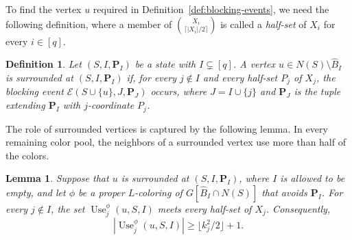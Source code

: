 \documentclass[12pt]{article}
\numberwithin{equation}{section}
\newtheorem{lemma}[theorem]{Lemma}
\newtheorem{definition}[theorem]{Definition}
\theoremstyle{definition}
\newcommand{\Use}{\operatorname{Use}}
\begin{document}
To find the vertex $u$ required in
Definition~\ref{def:blocking-events}, we need the following definition,
where a member of
$\binom{X_i}{\lceil |X_i|/2\rceil}$ is called a \emph{half-set} of $X_i$
for every $i\in[q]$.

\begin{definition}\label{def:surrounded}
Let $(S,I,\mathbf{P}_I)$ be a state with $I \subsetneq [q]$. A vertex
$u \in N(S) \setminus \hat{B}_{I}$ is \emph{surrounded at}
$(S,I,\mathbf{P}_I)$ if, for every $j \notin I$ and every half-set $P_j$ of
$X_j$, the blocking event
$\mathcal{E}(S \cup \{u\},J,\mathbf{P}_J)$ occurs, where
$J = I \cup \{j\}$ and $\mathbf{P}_J$ is the tuple extending $\mathbf{P}_I$ with
$j$-coordinate $P_j$.
\end{definition}

The role of surrounded vertices is captured by the following lemma. In every
remaining color pool, the neighbors of a surrounded vertex use more than half
of the colors.

\begin{lemma}\label{lem:recursive-hit}
Suppose that $u$ is surrounded at
$(S,I,\mathbf{P}_I)$, where $I$ is allowed to be empty, and let $\phi$ be a
proper $L$-coloring of $G[\hat{B}_{I} \cap N(S)]$ that avoids
$\mathbf{P}_I$.
For every $j \notin I$, the set $\Use_j^\phi(u, S, I)$ meets every
half-set of $X_j$. Consequently,
\[
 |\Use_j^\phi(u, S, I)| \geq \lfloor k_j^2/2\rfloor + 1.
\]
\end{lemma}
\end{document}

